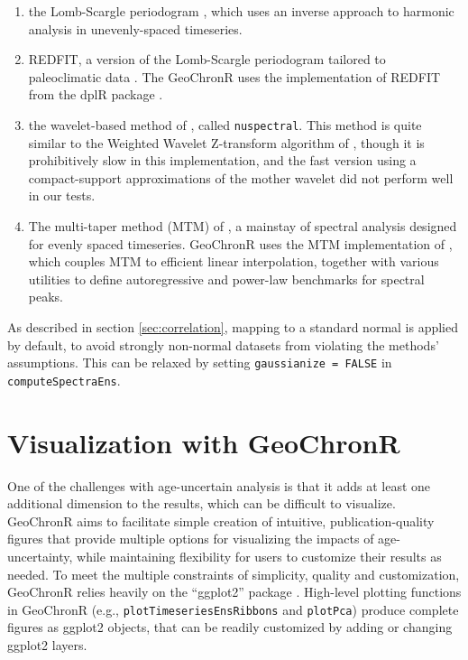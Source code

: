 \documentclass[gchron, manuscript]{copernicus}
\begin{document}
\begin{enumerate}
\def\labelenumi{\arabic{enumi}.}
\item
  the Lomb-Scargle periodogram \citep{VanderPlas_2018}, which uses an inverse approach to harmonic analysis in unevenly-spaced timeseries.
\item
  REDFIT, a version of the Lomb-Scargle periodogram tailored to paleoclimatic data \citep{SchulzMudelsee_02, Mudelsee_02, Mudelsee_NPG09}.
  The GeoChronR uses the implementation of REDFIT from the dplR package \citep{Bunn2008115}.
\item
  the wavelet-based method of \citet{Mathias_JSS04}, called \texttt{nuspectral}. This method is quite similar to the Weighted Wavelet Z-transform algorithm of \citet{Foster_AJ96}, though it is prohibitively slow in this implementation, and the fast version using a compact-support approximations of the mother wavelet did not perform well in our tests.
\item
  The multi-taper method (MTM) of \citet{thomson82}, a mainstay of spectral analysis \citep{Ghil02} designed for evenly spaced timeseries.
  GeoChronR uses the MTM implementation of \citet{astrochron}, which couples MTM to efficient linear interpolation, together with various utilities to define autoregressive and power-law benchmarks for spectral peaks.
\end{enumerate}

As described in section \ref{sec:correlation}, mapping to a standard normal is applied by default, to avoid strongly non-normal datasets from violating the methods' assumptions.
This can be relaxed by setting \texttt{gaussianize\ =\ FALSE} in \texttt{computeSpectraEns}.

\hypertarget{sec:visualization}{%
\section{Visualization with GeoChronR}\label{sec:visualization}}

One of the challenges with age-uncertain analysis is that it adds at least one additional dimension to the results, which can be difficult to visualize.
GeoChronR aims to facilitate simple creation of intuitive, publication-quality figures that provide multiple options for visualizing the impacts of age-uncertainty, while maintaining flexibility for users to customize their results as needed.
To meet the multiple constraints of simplicity, quality and customization, GeoChronR relies heavily on the ``ggplot2'' package \citep{ggplot2}.
High-level plotting functions in GeoChronR (e.g., \texttt{plotTimeseriesEnsRibbons} and \texttt{plotPca}) produce complete figures as ggplot2 objects, that can be readily customized by adding or changing ggplot2 layers.
\end{document}
